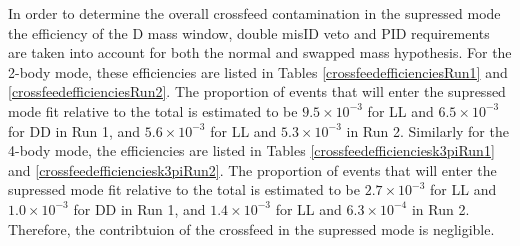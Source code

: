 In order to determine the overall crossfeed contamination in the supressed mode the efficiency of the D mass window, double misID veto and PID requirements are taken into account for both the normal and swapped \Dz mass hypothesis. For the 2-body mode, these efficiencies are listed in Tables \ref{crossfeedefficienciesRun1} and \ref{crossfeedefficienciesRun2}. The proportion of events that will enter the supressed mode fit relative to the total \decay{\Bm}{\D(\Kp\pim)\Kstarm} is estimated to be $9.5 \times 10^{-3}$ for LL and $6.5 \times 10^{-3}$ for DD in Run 1, and $5.6 \times 10^{-3}$ for LL and $5.3 \times 10^{-3}$ in Run 2. Similarly for the 4-body mode, the efficiencies are listed in Tables \ref{crossfeedefficienciesk3piRun1} and \ref{crossfeedefficienciesk3piRun2}. The proportion of events that will enter the supressed mode fit relative to the total \decay{\Bm}{\D(\Kp\pim\pip\pim)\Kstarm} is estimated to be $2.7 \times 10^{-3}$ for LL and $1.0 \times 10^{-3}$ for DD in Run 1, and $1.4 \times 10^{-3}$ for LL and $6.3 \times 10^{-4}$ in Run 2. Therefore, the contribtuion of the crossfeed in the supressed mode is negligible.


